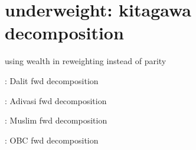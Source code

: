 \documentclass{article}
\begin{document}
\maketitle

\section{underweight: kitagawa decomposition}

using wealth in reweighting instead of parity



\begin{table}[H]
    \centering
    \footnotesize %
    \caption{: Dalit fwd decomposition}
    \label{tab:sumstat}
\end{table}

\begin{table}[H]
    \centering
    \footnotesize %
    \caption{: Adivasi fwd decomposition}
    \label{tab:sumstat}
\end{table}



\begin{table}[H]
    \centering
    \footnotesize %
    \caption{: Muslim fwd decomposition}
    \label{tab:sumstat}
\end{table}

\begin{table}[H]
    \centering
    \footnotesize %
    \caption{: OBC fwd decomposition}
    \label{tab:sumstat}
\end{table}
\end{document}
